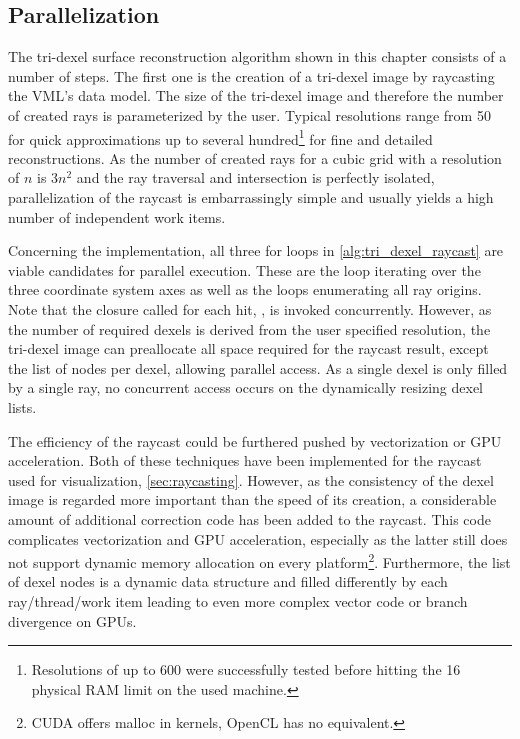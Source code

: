 \subsection{Parallelization}
\label{sec:tri_dexel_parallelization}

The tri-dexel surface reconstruction algorithm shown in this chapter consists of a number of steps.
The first one is the creation of a tri-dexel image by raycasting the VML's data model.
The size of the tri-dexel image and therefore the number of created rays is parameterized by the user.
Typical resolutions range from 50 for quick approximations up to several hundred\footnote{Resolutions of up to 600 were successfully tested before hitting the \SI{16}{\gibi\byte} physical RAM limit on the used machine.} for fine and detailed reconstructions.
As the number of created rays for a cubic grid with a resolution of $n$ is $3n^2$ and the ray traversal and intersection is perfectly isolated, parallelization of the raycast is embarrassingly simple and usually yields a high number of independent work items.

Concerning the implementation, all three for loops in \cref{alg:tri_dexel_raycast} are viable candidates for parallel execution.
These are the loop iterating over the three coordinate system axes as well as the loops enumerating all ray origins.
Note that the closure called for each hit, , is invoked concurrently.
However, as the number of required dexels is derived from the user specified resolution, the tri-dexel image can preallocate all space required for the raycast result, except the list of nodes per dexel, allowing parallel access.
As a single dexel is only filled by a single ray, no concurrent access occurs on the dynamically resizing dexel lists.

The efficiency of the raycast could be furthered pushed by vectorization or GPU acceleration.
Both of these techniques have been implemented for the raycast used for visualization, \cf \cref{sec:raycasting}.
However, as the consistency of the dexel image is regarded more important than the speed of its creation, a considerable amount of additional correction code has been added to the raycast.
This code complicates vectorization and GPU acceleration, especially as the latter still does not support dynamic memory allocation on every platform\footnote{CUDA offers malloc in kernels, OpenCL has no equivalent.}.
Furthermore, the list of dexel nodes is a dynamic data structure and filled differently by each ray/thread/work item leading to even more complex vector code or branch divergence on GPUs.

